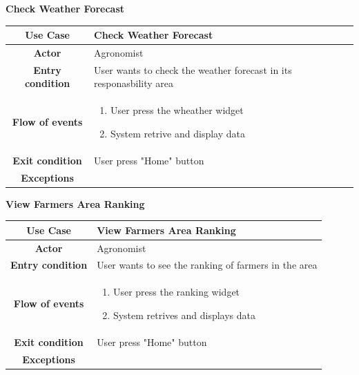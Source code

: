 \documentclass[table, 12pt]{article}
\begin{document}
\begin{itemize}
            \begin{table}[H]
                \item[] \textbf{Check Weather Forecast}
                \item[] 
                \centering
                \begin{tabular}{|c |m{}|}
                    \hline
                    \textbf{Use Case} & Check Weather Forecast\\ \hline
                    \textbf{Actor} & Agronomist\\ \hline
                    \textbf{Entry condition} & User wants to check the weather forecast in its responasbility area \\  \hline
                    \textbf{Flow of events} & \begin{enumerate}
                                                \item User press the wheather widget
                                                \item System retrive and display data 
                                            \end{enumerate}\\ \hline
                    \textbf{Exit condition} & User press "Home" button\\ \hline
                    \textbf{Exceptions} & \\ \hline                    
                \end{tabular}
            \end{table}

            \begin{table}[H]
                \item[] \textbf{View Farmers Area Ranking}
                \item[] 
                \centering
                \begin{tabular}{|c |m{}|}
                    \hline
                    \textbf{Use Case} & View Farmers Area Ranking\\ \hline
                    \textbf{Actor} & Agronomist\\ \hline
                    \textbf{Entry condition} & User wants to see the ranking of farmers in the area\\  \hline
                    \textbf{Flow of events} & \begin{enumerate}
                                                \item User press the ranking widget 
                                                \item System retrives and displays data
                                            \end{enumerate}\\ \hline
                    \textbf{Exit condition} & User press "Home" button\\ \hline
                    \textbf{Exceptions} & \\ \hline                    
                \end{tabular}
            \end{table}
            

\end{itemize}
\end{document}
